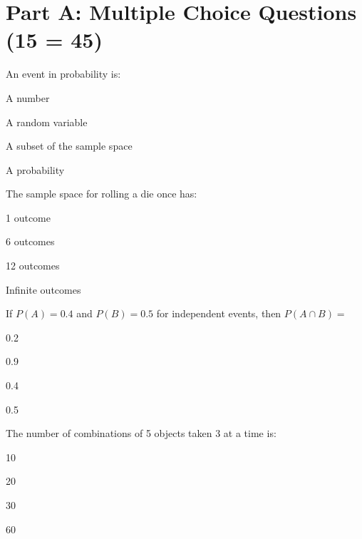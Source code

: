 \documentclass{USTBExam}
\begin{document}
\maketitle

\section{Part A: Multiple Choice Questions (15  = 45)}

\begin{question}
An event in probability is:
\paren
\begin{choices}
\item A number
\item A random variable
\item A subset of the sample space
\item A probability
\end{choices}
\end{question}

\begin{question}
The sample space for rolling a die once has:
\paren
\begin{choices}
\item 1 outcome
\item 6 outcomes
\item 12 outcomes
\item Infinite outcomes
\end{choices}
\end{question}

\begin{question}
If $P(A)=0.4$ and $P(B)=0.5$ for independent events, then $P(A\cap B)=$
\paren
\begin{choices}
\item 0.2
\item 0.9
\item 0.4
\item 0.5
\end{choices}
\end{question}

\begin{question}
The number of combinations of 5 objects taken 3 at a time is:
\paren
\begin{choices}
\item 10
\item 20
\item 30
\item 60
\end{choices}
\end{question}
\end{document}
